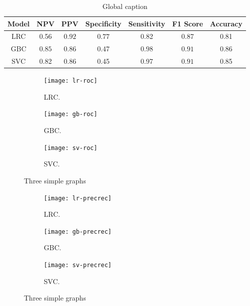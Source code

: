 \documentclass[twoside,11pt]{article}
\begin{document}
\begin{table}[!htb]
    \caption{Global caption}
    \centering
    \begin{tabular}{|c|c|c|c|c|c|c|}
        \hline
        \textbf{Model} & \textbf{NPV} & \textbf{PPV} & \textbf{Specificity} & \textbf{Sensitivity} & \textbf{F1 Score} & \textbf{Accuracy} \\
        \hline
        LRC & 0.56 & $\mathbf{0.92}$ & $\mathbf{0.77}$ & 0.82 & 0.87 & 0.81 \\
        GBC & $\mathbf{0.85}$ & 0.86 & 0.47 & $\mathbf{0.98}$ & $\mathbf{0.91}$ & $\mathbf{0.86}$ \\
        SVC & 0.82 & 0.86 & 0.45 & 0.97 & $\mathbf{0.91}$ & 0.85 \\
        \hline
    \end{tabular}
\end{table}

\begin{figure}[h]
    \centering
    \begin{subfigure}[b]{0.3\textwidth}
        \centering
        \texttt{[image: lr-roc]}
        \caption{LRC.}
        \label{fig:lr-roc}
    \end{subfigure}
    \hfill
    \begin{subfigure}[b]{0.3\textwidth}
        \centering
        \texttt{[image: gb-roc]}
        \caption{GBC.}
        \label{fig:gb-roc}
    \end{subfigure}
    \hfill
    \begin{subfigure}[b]{0.3\textwidth}
        \centering
        \texttt{[image: sv-roc]}
        \caption{SVC.}
        \label{fig:sv-roc}
    \end{subfigure}
       \caption{Three simple graphs}
       \label{fig:roc}
\end{figure}

\begin{figure}[h]
    \centering
    \begin{subfigure}[b]{0.3\textwidth}
        \centering
        \texttt{[image: lr-precrec]}
        \caption{LRC.}
        \label{fig:lr-precrec}
    \end{subfigure}
    \hfill
    \begin{subfigure}[b]{0.3\textwidth}
        \centering
        \texttt{[image: gb-precrec]}
        \caption{GBC.}
        \label{fig:gb-precrec}
    \end{subfigure}
    \hfill
    \begin{subfigure}[b]{0.3\textwidth}
        \centering
        \texttt{[image: sv-precrec]}
        \caption{SVC.}
        \label{fig:sv-precrec}
    \end{subfigure}
       \caption{Three simple graphs}
       \label{fig:precrec}
\end{figure}
\end{document}
